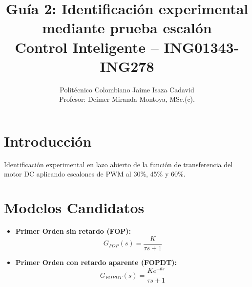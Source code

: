 \documentclass[11pt,a4paper]{article}
\title{\textbf{Guía 2: Identificación experimental mediante prueba escalón}\\Control Inteligente -- ING01343-ING278}
\author{Politécnico Colombiano Jaime Isaza Cadavid\\Profesor: Deimer Miranda Montoya, MSc.(c).}
\date{}
\begin{document}
\maketitle

\section{Introducción}
Identificación experimental en lazo abierto de la función de transferencia del motor DC aplicando escalones de PWM al 30\%, 45\% y 60\%.

\section{Modelos Candidatos}
\begin{itemize}
    \item \textbf{Primer Orden sin retardo (FOP):}
    \begin{equation}
    G_{FOP}(s) = \frac{K}{\tau s + 1}
    \end{equation}
    \item \textbf{Primer Orden con retardo aparente (FOPDT):}
    \begin{equation}
    G_{FOPDT}(s) = \frac{K e^{-\theta s}}{\tau s + 1}
    \end{equation}
\end{itemize}
\end{document}
